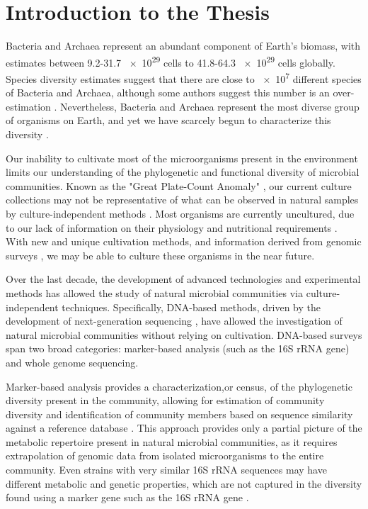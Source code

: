 \chapter{Introduction to the Thesis}
    Bacteria and Archaea represent an abundant component of Earth's biomass, with estimates between 9.2-31.7 \num{e29} cells \cite{Kallmeyer:2012km} to 41.8-64.3 \num{e29} cells \cite{Whitman:1998tj} globally. Species diversity estimates suggest that there are close to \num{e7} different species of Bacteria and Archaea\cite{Curtis:2002dj}, although some authors suggest this number is an over-estimation \cite{Schloss:2004do}. Nevertheless, Bacteria and Archaea represent the most diverse group of organisms on Earth, and yet we have scarcely begun to characterize this diversity \cite{Wu:2009ju, Rinke:2013bt}.

    Our inability to cultivate most of the microorganisms present in the environment limits our understanding of the phylogenetic and functional diversity of microbial communities. Known as the "Great Plate-Count Anomaly" \cite{Staley:1985ww}, our current culture collections may not be representative of what can be observed in natural samples by culture-independent methods \cite{Amann:1995tw}. Most organisms are currently uncultured, due to our lack of information on their physiology and nutritional requirements \cite{Stewart:2012dd}. With new and unique cultivation methods, and information derived from genomic surveys \cite{Tyson:2005by}, we may be able to culture these organisms in the near future.
    
   Over the last decade, the development of advanced technologies and experimental methods has allowed the study of natural microbial communities via culture-independent techniques. Specifically, DNA-based methods, driven by the development of next-generation sequencing \cite{Mardis:2008fr}, have allowed the investigation of natural microbial communities without relying on cultivation. DNA-based surveys span two broad categories: marker-based analysis (such as the 16S rRNA gene) and whole genome sequencing.
    
    Marker-based analysis provides a characterization,or census, of the phylogenetic diversity present in the community, allowing for estimation of community diversity\cite{Caporaso:2011cs, Rappe:2003fc, Caporaso:2010bi} and identification of community members based on sequence similarity against a reference database  \cite{McDonald:2011hn}. This approach provides only a partial picture of the metabolic repertoire present in natural microbial communities, as it requires extrapolation of genomic data from isolated microorganisms to the entire community. Even strains with very similar 16S rRNA sequences may have different metabolic and genetic properties, which are not captured in the diversity found using a marker gene such as the 16S rRNA gene \cite{Jaspers:2004ge}.
    
